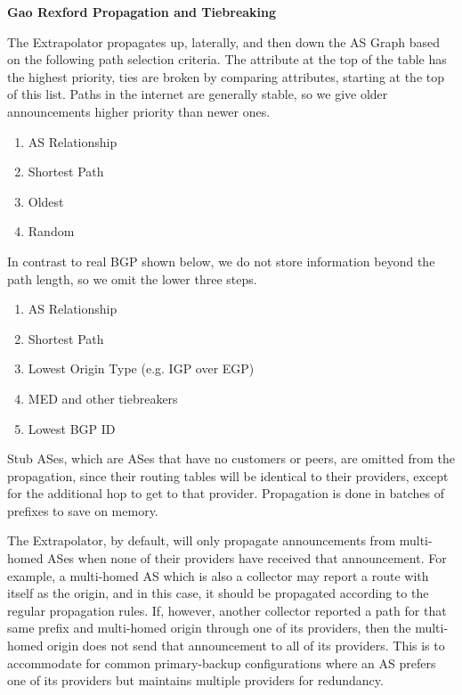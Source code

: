 \documentclass[letterpaper]{article}
\begin{document}
\textbf{Gao Rexford Propagation and Tiebreaking}

The Extrapolator propagates up, laterally, and then down the AS Graph based on
the following path selection criteria. The attribute at the top of the table
has the highest priority, ties are broken by comparing attributes, starting at
the top of this list. Paths in the internet are generally stable,
so we give older announcements higher priority than newer ones.

\begin{enumerate}
  \item AS Relationship
  \item Shortest Path
  \item Oldest
  \item Random
\end{enumerate}

In contrast to real BGP shown below, we do not store information beyond the
path length, so we omit the lower three steps.

\begin{enumerate}
  \item AS Relationship
  \item Shortest Path
  \item Lowest Origin Type (e.g. IGP over EGP)
  \item MED and other tiebreakers
  \item Lowest BGP ID
\end{enumerate}

Stub ASes, which are ASes that have no customers or peers, are omitted
from the propagation, since their routing tables will be identical to
their providers, except for the additional hop to get to that provider.
Propagation is done in batches of prefixes to save on memory.

The Extrapolator, by default, will only propagate announcements from
multi-homed ASes when none of their providers have received that announcement.
For example, a multi-homed AS which is also a collector may report a route with
itself as the origin, and in this case, it should be propagated according to
the regular propagation rules. If, however, another collector reported a path
for that same prefix and multi-homed origin through one of its providers, then
the multi-homed origin does not send that announcement to all of its providers.
This is to accommodate for common primary-backup configurations where an AS
prefers one of its providers but maintains multiple providers for redundancy. 
\end{document}
